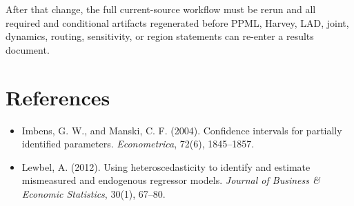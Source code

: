 \documentclass[11pt]{article}
\begin{document}
After that change, the full current-source workflow must be rerun and all
required and conditional artifacts regenerated before PPML, Harvey, LAD,
joint, dynamics, routing, sensitivity, or region statements can re-enter a
results document.

\section*{References}

\begin{itemize}[leftmargin=1.5em]
  \item Imbens, G. W., and Manski, C. F. (2004). Confidence intervals for
    partially identified parameters. \emph{Econometrica}, 72(6), 1845--1857.
  \item Lewbel, A. (2012). Using heteroscedasticity to identify and estimate
    mismeasured and endogenous regressor models.
    \emph{Journal of Business \& Economic Statistics}, 30(1), 67--80.
\end{itemize}
\end{document}
